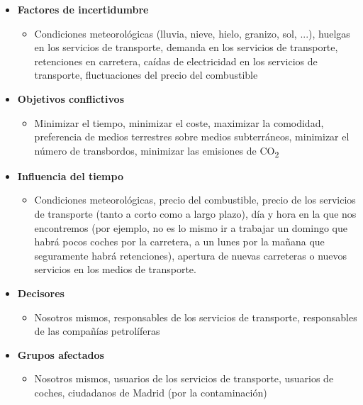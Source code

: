 \documentclass[12pt,a4paper,openright,final]{article}
\begin{document}
\begin{itemize}

\item \textbf{Factores de incertidumbre}

\begin{itemize}
\item Condiciones meteorológicas (lluvia, nieve, hielo, granizo, sol, ...), huelgas en los servicios de transporte, demanda en los servicios de transporte, retenciones en carretera, caídas de electricidad en los servicios de transporte, fluctuaciones del precio del combustible
\end{itemize}

\item \textbf{Objetivos conflictivos}

\begin{itemize}
\item Minimizar el tiempo, minimizar el coste, maximizar la comodidad, preferencia de medios terrestres sobre medios subterráneos, minimizar el número de transbordos, minimizar las emisiones de CO\textsubscript{2}
\end{itemize}

\item \textbf{Influencia del tiempo}

\begin{itemize}
\item Condiciones meteorológicas, precio del combustible, precio de los servicios de transporte (tanto a corto como a largo plazo), día y hora en la que nos encontremos (por ejemplo, no es lo mismo ir a trabajar un domingo que habrá pocos coches por la carretera, a un lunes por la mañana que seguramente habrá retenciones), apertura de nuevas carreteras o nuevos servicios en los medios de transporte.
\end{itemize}

\item \textbf{Decisores}

\begin{itemize}
\item Nosotros mismos, responsables de los servicios de transporte, responsables de las compañías petrolíferas
\end{itemize}

\item \textbf{Grupos afectados}

\begin{itemize}
\item Nosotros mismos, usuarios de los servicios de transporte, usuarios de coches, ciudadanos de Madrid (por la contaminación)
\end{itemize}

\end{itemize}
\end{document}
